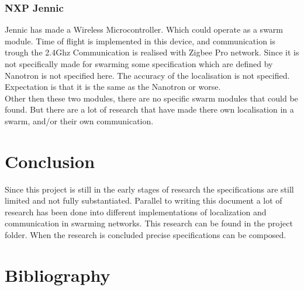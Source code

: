 \documentclass[10pt,a4paper]{article}
\begin{document}
\subsubsection{NXP Jennic} 

Jennic has made a Wireless Microcontroller. Which could operate as a swarm module. Time of flight is implemented in this device, and communication is trough the 2.4Ghz Communication is realised with Zigbee Pro network. Since it is not specifically made for swarming some specification which are defined by Nanotron is not specified here. The accuracy of the localisation is not specified. Expectation is that it is the same as the Nanotron or worse. \cite{wirelessmicrocontroller}\\

Other then these two modules, there are no specific swarm modules that could be found. But there are a lot of research that have made there own localisation in a swarm, and/or their own communication. 

\newpage
\section{Conclusion}
Since this project is still in the early stages of research the specifications are still limited and not fully substantiated. Parallel to writing this document a lot of research has been done into different implementations of localization and communication in swarming networks. This research can be found in the project folder. When the research is concluded precise specifications can be composed. 

\newpage



\section{Bibliography}


\end{document}
